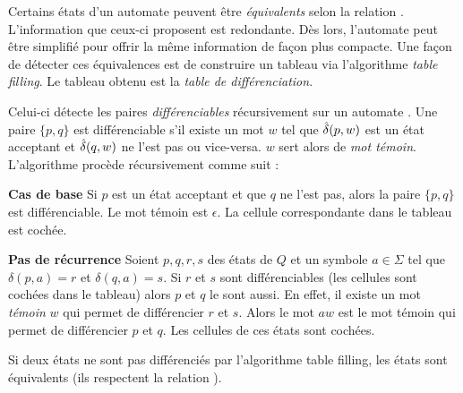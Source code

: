 Certains états d'un automate peuvent être \emph{équivalents} selon la relation \rf. L'information que ceux-ci proposent est redondante. Dès lors, l'automate peut être simplifié pour offrir la même information de façon plus compacte. Une façon de détecter ces équivalences est de construire un tableau via l'algorithme \emph{table filling}. Le tableau obtenu est la \emph{table de différenciation}.

Celui-ci détecte les paires \emph{différenciables} récursivement sur un automate \automaton. Une paire $\{p,q\}$ est différenciable s'il existe un mot $w$ tel que $\hat{\delta}(p,w)$ est un état acceptant et $\hat{\delta}(q,w)$ ne l'est pas ou vice-versa. $w$ sert alors de \emph{mot témoin}. L'algorithme procède récursivement comme suit :

\textbf{Cas de base} Si $p$ est un état acceptant et que $q$ ne l'est pas, alors la paire $\{p,q\}$ est différenciable. Le mot témoin est $\epsilon$. La cellule correspondante dans le tableau est cochée.

\textbf{Pas de récurrence} Soient $p,q,r,s$ des états de $Q$ et un symbole $a \in \Sigma$ tel que $\delta(p,a)=r$ et $\delta(q,a)=s$. Si $r$ et $s$ sont différenciables (les cellules sont cochées dans le tableau) alors $p$ et $q$ le sont aussi. En effet, il existe un mot \emph{témoin} $w$ qui permet de différencier $r$ et $s$. Alors le mot $aw$ est le mot témoin qui permet de différencier $p$ et $q$. Les cellules de ces états sont cochées.

\begin{theorem}
 Si deux états ne sont pas différenciés par l'algorithme table filling, les états sont équivalents (ils respectent la relation \rf).
\end{theorem}

